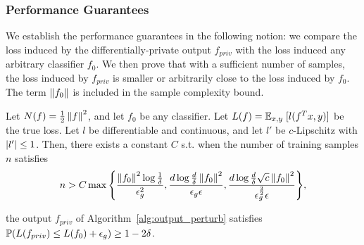 \documentclass{article} %
\begin{document}
\subsubsection{Performance Guarantees}
We establish the performance guarantees in the following notion: we compare the loss induced by the differentially-private output $f_{priv}$ with the loss induced any arbitrary classifier $f_0$. We then prove that with a sufficient number of samples, the loss induced by $f_{priv}$ is smaller or arbitrarily close to the loss induced by $f_0$. The term $\left\lVert f_0\right\rVert$ is included in the sample complexity bound.
\begin{theorem} Let $N(f) = \frac{1}{2}\left\lVert f\right\rVert^2$, and let $f_0$ be any classifier. Let $L(f) = \mathbb{E}_{x, y}\; [l(f^T x, y)]$ be the true loss. Let $l$ be differentiable and continuous, and let $l'$ be $c$-Lipschitz with $\left\lvert l'\right\rvert \le 1$. Then, there exists a constant $C$ s.t. when the number of training samples $n$ satisfies
$$n > C\max{\left\{\frac{\left\lVert f_0\right\rVert^2 \log{\frac{1}{\delta}}}{\epsilon_g^2}, \frac{d\log{\frac{d}{\delta}}\left\lVert f_0\right\rVert^2}{\epsilon_g \epsilon}, \frac{d\log{\frac{d}{\delta}}\sqrt{c} \left\lVert f_0\right\rVert^2}{\epsilon_g^{\frac{3}{2}}\epsilon}\right\}},$$

the output $f_{priv}$ of Algorithm~\ref{alg:output_perturb} satisfies $\mathbb{P}(L(f_{priv}) \le L(f_0) + \epsilon_g) \ge 1 - 2\delta$.
\end{theorem}
\end{document}

